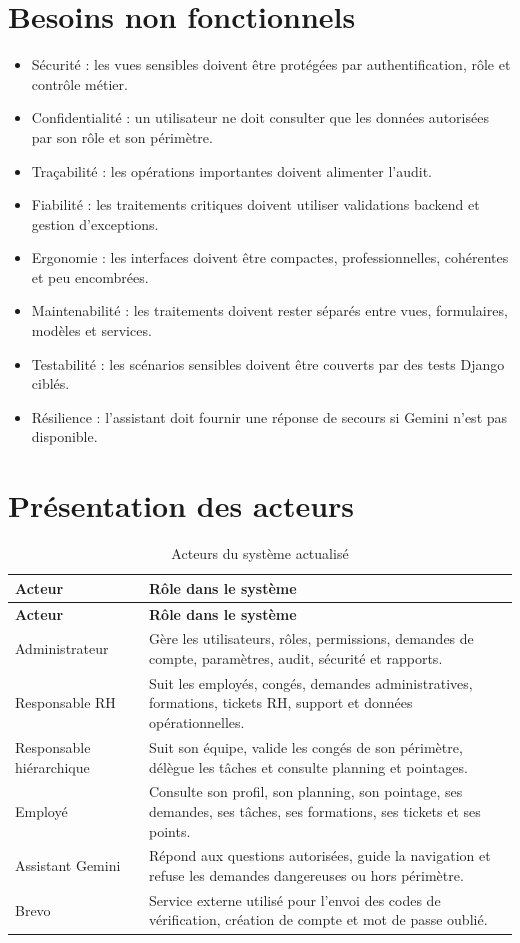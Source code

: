 \documentclass[12pt,a4paper]{report}
\begin{document}
\section{Besoins non fonctionnels}
\begin{itemize}
\item Sécurité : les vues sensibles doivent être protégées par authentification, rôle et contrôle métier.
\item Confidentialité : un utilisateur ne doit consulter que les données autorisées par son rôle et son périmètre.
\item Traçabilité : les opérations importantes doivent alimenter l'audit.
\item Fiabilité : les traitements critiques doivent utiliser validations backend et gestion d'exceptions.
\item Ergonomie : les interfaces doivent être compactes, professionnelles, cohérentes et peu encombrées.
\item Maintenabilité : les traitements doivent rester séparés entre vues, formulaires, modèles et services.
\item Testabilité : les scénarios sensibles doivent être couverts par des tests Django ciblés.
\item Résilience : l'assistant doit fournir une réponse de secours si Gemini n'est pas disponible.
\end{itemize}

\section{Présentation des acteurs}
\begin{longtable}{p{4cm}p{10cm}}
\caption{Acteurs du système actualisé}\label{tab:acteurs}\\
\toprule
\textbf{Acteur} & \textbf{Rôle dans le système}\\
\midrule
\endfirsthead
\toprule
\textbf{Acteur} & \textbf{Rôle dans le système}\\
\midrule
\endhead
Administrateur & Gère les utilisateurs, rôles, permissions, demandes de compte, paramètres, audit, sécurité et rapports.\\
Responsable RH & Suit les employés, congés, demandes administratives, formations, tickets RH, support et données opérationnelles.\\
Responsable hiérarchique & Suit son équipe, valide les congés de son périmètre, délègue les tâches et consulte planning et pointages.\\
Employé & Consulte son profil, son planning, son pointage, ses demandes, ses tâches, ses formations, ses tickets et ses points.\\
Assistant Gemini & Répond aux questions autorisées, guide la navigation et refuse les demandes dangereuses ou hors périmètre.\\
Brevo & Service externe utilisé pour l'envoi des codes de vérification, création de compte et mot de passe oublié.\\
\bottomrule
\end{longtable}
\end{document}
